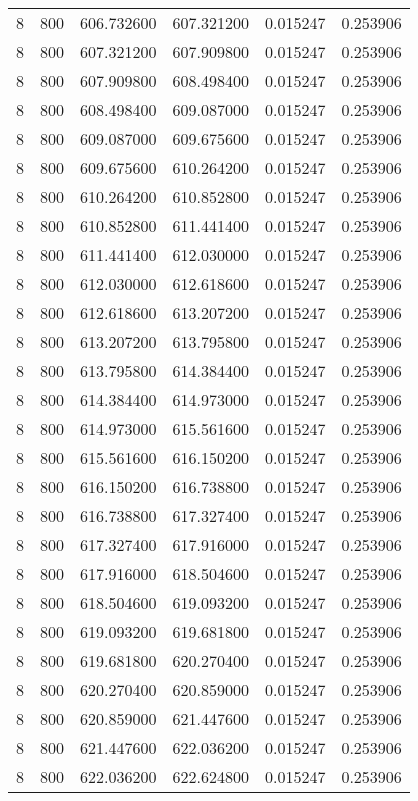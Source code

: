 \begin{longtable}{rrrrrr}
8 & 800 & 606.732600 & 607.321200 & 0.015247 & 0.253906 \\
8 & 800 & 607.321200 & 607.909800 & 0.015247 & 0.253906 \\
8 & 800 & 607.909800 & 608.498400 & 0.015247 & 0.253906 \\
8 & 800 & 608.498400 & 609.087000 & 0.015247 & 0.253906 \\
8 & 800 & 609.087000 & 609.675600 & 0.015247 & 0.253906 \\
8 & 800 & 609.675600 & 610.264200 & 0.015247 & 0.253906 \\
8 & 800 & 610.264200 & 610.852800 & 0.015247 & 0.253906 \\
8 & 800 & 610.852800 & 611.441400 & 0.015247 & 0.253906 \\
8 & 800 & 611.441400 & 612.030000 & 0.015247 & 0.253906 \\
8 & 800 & 612.030000 & 612.618600 & 0.015247 & 0.253906 \\
8 & 800 & 612.618600 & 613.207200 & 0.015247 & 0.253906 \\
8 & 800 & 613.207200 & 613.795800 & 0.015247 & 0.253906 \\
8 & 800 & 613.795800 & 614.384400 & 0.015247 & 0.253906 \\
8 & 800 & 614.384400 & 614.973000 & 0.015247 & 0.253906 \\
8 & 800 & 614.973000 & 615.561600 & 0.015247 & 0.253906 \\
8 & 800 & 615.561600 & 616.150200 & 0.015247 & 0.253906 \\
8 & 800 & 616.150200 & 616.738800 & 0.015247 & 0.253906 \\
8 & 800 & 616.738800 & 617.327400 & 0.015247 & 0.253906 \\
8 & 800 & 617.327400 & 617.916000 & 0.015247 & 0.253906 \\
8 & 800 & 617.916000 & 618.504600 & 0.015247 & 0.253906 \\
8 & 800 & 618.504600 & 619.093200 & 0.015247 & 0.253906 \\
8 & 800 & 619.093200 & 619.681800 & 0.015247 & 0.253906 \\
8 & 800 & 619.681800 & 620.270400 & 0.015247 & 0.253906 \\
8 & 800 & 620.270400 & 620.859000 & 0.015247 & 0.253906 \\
8 & 800 & 620.859000 & 621.447600 & 0.015247 & 0.253906 \\
8 & 800 & 621.447600 & 622.036200 & 0.015247 & 0.253906 \\
8 & 800 & 622.036200 & 622.624800 & 0.015247 & 0.253906 \\

\end{longtable}
